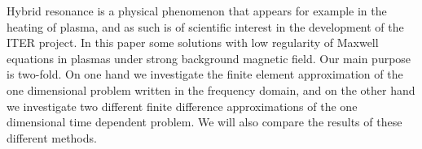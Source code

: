Hybrid resonance is a physical phenomenon
that appears for example in the heating of plasma,
and as such is of scientific interest in the development  of  the ITER project.
In this paper  some solutions with low regularity of Maxwell equations in
plasmas under strong background magnetic field.
Our main purpose is two-fold.
On one hand we investigate the finite element approximation of the one dimensional problem 
written in the frequency domain, and on the other hand we investigate two different 
finite difference approximations of the one dimensional time dependent problem.
We will also compare the results of these different methods.